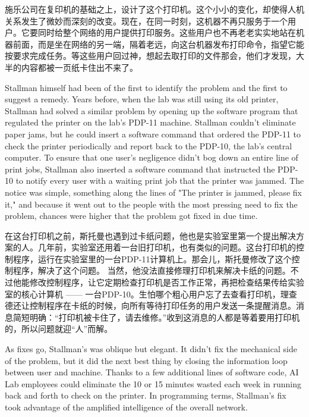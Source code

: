\ifdefined\chs
施乐公司在复印机的基础之上，设计了这个打印机。这个小小的变化，却使得人机关系发生了微妙而深刻的改变。现在，在同一时刻，这机器不再只服务于一个用户。它要同时给整个网络的用户提供打印服务。这些用户也不再老老实实地站在机器前面，而是坐在网络的另一端，隔着老远，向这台机器发布打印命令，指望它能按要求完成任务。等这些用户回过神，想起去取打印的文件那会，他们才发现，大半的内容都被一页纸卡住出不来了。
\fi

\ifdefined\eng
Stallman himself had been of the first to identify the problem and the first to suggest a remedy. Years before, when the lab was still using its old printer, Stallman had solved a similar problem by opening up the software program that regulated the printer on the lab's PDP-11 machine. Stallman couldn't eliminate paper jams, but he could insert a software command that ordered the PDP-11 to check the printer periodically and report back to the PDP-10, the lab's central computer. To ensure that one user's negligence didn't bog down an entire line of print jobs, Stallman also inserted a software command that instructed the PDP-10 to notify every user with a waiting print job that the printer was jammed. The notice was simple, something along the lines of "The printer is jammed, please fix it," and because it went out to the people with the most pressing need to fix the problem, chances were higher that the problem got fixed in due time.
\fi

\ifdefined\chs
在这台打印机之前，斯托曼也遇到过卡纸问题，他也是实验室里第一个提出解决方案的人。几年前，实验室还用着一台旧打印机，也有类似的问题。这台打印机的控制程序，运行在实验室里的一台PDP-11计算机上。那会儿，斯托曼修改了这个控制程序，解决了这个问题。
当然，他没法直接修理打印机来解决卡纸的问题。不过他能修改控制程序，让它定期检查打印机是否工作正常，再把检查结果传给实验室的核心计算机
——
一台PDP-10。生怕哪个粗心用户忘了去查看打印机，理查德还让控制程序在卡纸的时候，向所有等待打印任务的用户发送一条提醒消息。消息简短明确：``打印机被卡住了，请去维修。''收到这消息的人都是等着要用打印机的，所以问题就迎``人''而解。
\fi

\ifdefined\eng
As fixes go, Stallman's was oblique but elegant. It didn't fix the mechanical side of the problem, but it did the next best thing by closing the information loop between user and machine. Thanks to a few additional lines of software code, AI Lab employees could eliminate the 10 or 15 minutes wasted each week in running back and forth to check on the printer. In programming terms, Stallman's fix took advantage of the amplified intelligence of the overall network.
\fi

